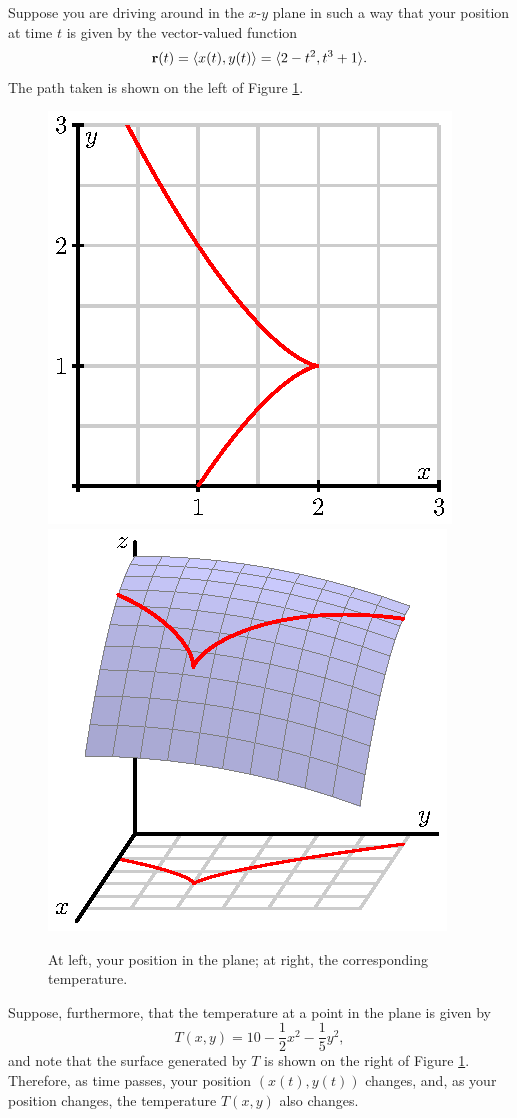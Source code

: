 \begin{pa} \label{PA:10.5} Suppose you are driving around in the
  $x$-$y$ plane in such a way that your position at time $t$ is given by the vector-valued
  function 
  $$
  \mathbf{r}(t) = \langle x(t), y(t) \rangle = \langle 2-t^2, t^3 + 1\rangle.
  $$
  The path taken is shown on the left of Figure
  \ref{F:10.5.preview}.  

  \begin{figure}
    \begin{center}
      \includegraphics{figures/fig_10_5_preview_r.eps}
      \hspace*{20pt}
      \includegraphics{figures/fig_10_5_preview_h.eps}
    \end{center}
    \caption{At left, your position in the plane; at right, the corresponding temperature.}
    \label{F:10.5.preview}
  \end{figure}
  Suppose, furthermore, that
  the temperature at a point in the plane is given by
  $$
  T(x,y) = 10 - \frac12x^2 -\frac15y^2,
  $$
  and note that the surface generated by $T$ is shown on the right of Figure \ref{F:10.5.preview}.  Therefore, as
  time passes, your position $(x(t), y(t))$ changes, and, as your position
  changes, the temperature $T(x,y)$ also changes.
  

\end{pa}

